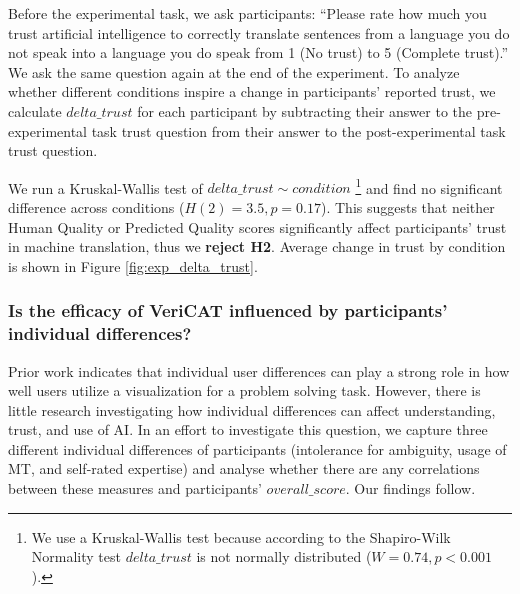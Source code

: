 Before the experimental task, we ask participants: “Please rate how much you trust artificial intelligence to correctly translate sentences from a language you do not speak into a language you do speak from 1 (No trust) to 5 (Complete trust).”  We ask the same question again at the end of the experiment. To analyze whether different conditions inspire a change in participants' reported trust, we calculate $delta\_trust$ for each participant by subtracting their answer to the pre-experimental task trust question from their answer to the post-experimental task trust question. 

We run a Kruskal-Wallis test of $delta\_trust \sim condition$ \footnote{We use a Kruskal-Wallis test because according to the Shapiro-Wilk Normality test $delta\_trust$ is not normally distributed ($W = 0.74, p < 0.001$).} and find no significant difference across conditions ($H(2) = 3.5, p = 0.17$). This suggests that neither Human Quality or Predicted Quality scores significantly affect participants’ trust in machine translation, thus we \textbf{reject H2}. Average change in trust by condition is shown in Figure \ref{fig:exp_delta_trust}.

\subsubsection{\textbf{Is the efficacy of VeriCAT influenced by participants' individual differences?}}

Prior work indicates that individual user differences can play a strong role in how well users utilize a visualization for a problem solving task\cite{liuSurvey2020}. However, there is little research investigating how individual differences can affect understanding, trust, and use of AI. In an effort to investigate this question, we capture three different individual differences of participants (intolerance for ambiguity, usage of MT, and self-rated expertise) and analyse whether there are any correlations between these measures and participants’ $overall\_score$. Our findings follow.

